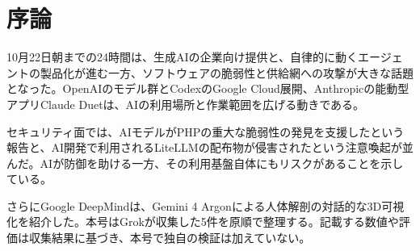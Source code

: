 \section*{序論}
10月22日朝までの24時間は、生成AIの企業向け提供と、自律的に動くエージェントの製品化が進む一方、ソフトウェアの脆弱性と供給網への攻撃が大きな話題となった。OpenAIのモデル群とCodexのGoogle Cloud展開、Anthropicの能動型アプリClaude Duetは、AIの利用場所と作業範囲を広げる動きである。

セキュリティ面では、AIモデルがPHPの重大な脆弱性の発見を支援したという報告と、AI開発で利用されるLiteLLMの配布物が侵害されたという注意喚起が並んだ。AIが防御を助ける一方、その利用基盤自体にもリスクがあることを示している。

さらにGoogle DeepMindは、Gemini 4 Argonによる人体解剖の対話的な3D可視化を紹介した。本号はGrokが収集した5件を原順で整理する。記載する数値や評価は収集結果に基づき、本号で独自の検証は加えていない。
